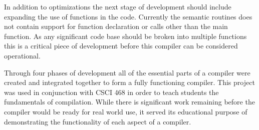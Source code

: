 \documentclass[12pt]{article}
\begin{document}
            In addition to optimizations the next stage of development should include expanding the use of functions in the code.  Currently the semantic routines does not contain support for function declaration or calls other than the main function.  As any significant code base should be broken into multiple functions this is a critical piece of development before this compiler can be considered operational.
            
            Through four phases of development all of the essential parts of a compiler were created and integrated together to form a fully functioning compiler.  This project was used in conjunction with CSCI 468 in order to teach students the fundamentals of compilation.  While there is significant work remaining before the compiler would be ready for real world use, it served its educational purpose of demonstrating the functionality of each aspect of a compiler.
    
 
\end{document}
